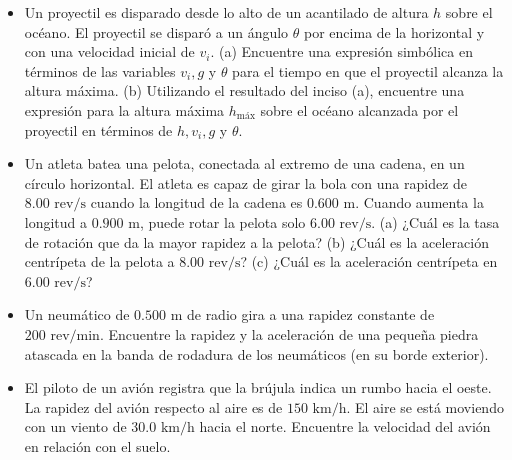 \documentclass[11pt,a4paper]{article}
\begin{document}
\newpage

\begin{itemize}
    \item[\textbf{5.}] Un proyectil es disparado desde lo alto de un acantilado de altura $h$ sobre el océano. El proyectil se disparó a un ángulo $\theta$ por encima de la horizontal y con una velocidad inicial de $v_i$. (a) Encuentre una expresión simbólica en términos de las variables $v_i, g$ y $\theta$ para el tiempo en que el proyectil alcanza la altura máxima. (b) Utilizando el resultado del inciso (a), encuentre una expresión para la altura máxima $h_{\text{máx}}$ sobre el océano alcanzada por el proyectil en términos de $h, v_i, g$ y $\theta$.
    \vspace*{6cm}

    \item[\textbf{6.}] Un atleta batea una pelota, conectada al extremo de una cadena, en un círculo horizontal. El atleta es capaz de girar la bola con una rapidez de $8.00 \text{ rev/s}$ cuando la longitud de la cadena es $0.600 \text{ m}$. Cuando aumenta la longitud a $0.900 \text{ m}$, puede rotar la pelota solo $6.00 \text{ rev/s}$. (a) ¿Cuál es la tasa de rotación que da la mayor rapidez a la pelota? (b) ¿Cuál es la aceleración centrípeta de la pelota a $8.00 \text{ rev/s}$? (c) ¿Cuál es la aceleración centrípeta en $6.00 \text{ rev/s}$?
    \vspace*{6cm}

    \item[\textbf{7.}] Un neumático de $0.500 \text{ m}$ de radio gira a una rapidez constante de $200 \text{ rev/min}$. Encuentre la rapidez y la aceleración de una pequeña piedra atascada en la banda de rodadura de los neumáticos (en su borde exterior).
    \vspace*{6cm}

    \item[\textbf{8.}] El piloto de un avión registra que la brújula indica un rumbo hacia el oeste. La rapidez del avión respecto al aire es de $150 \text{ km/h}$. El aire se está moviendo con un viento de $30.0 \text{ km/h}$ hacia el norte. Encuentre la velocidad del avión en relación con el suelo.
    \vspace*{6cm}
\end{itemize}

\newpage
\end{document}
